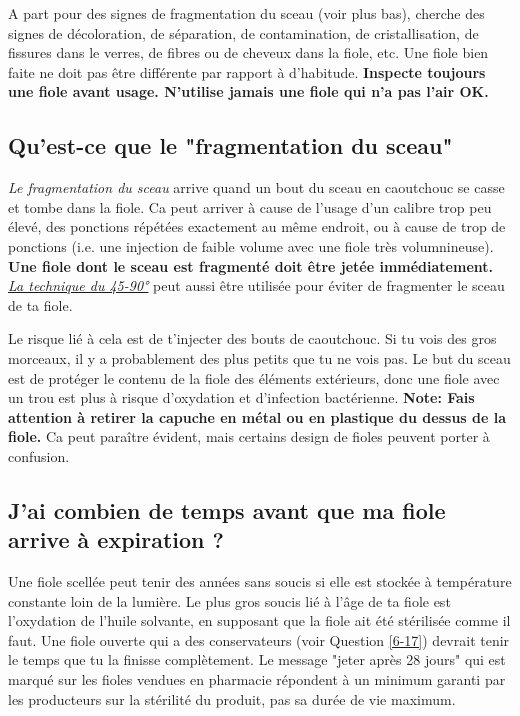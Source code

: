 \documentclass{article}
\begin{document}
A part pour des signes de fragmentation du sceau (voir plus bas), cherche des signes de décoloration, de séparation, de contamination, de cristallisation, de fissures dans le verres, de fibres ou de cheveux dans la fiole, etc. Une fiole bien faite ne doit pas être différente par rapport à d'habitude. \textbf{Inspecte toujours une fiole avant usage. N'utilise jamais une fiole qui n'a pas l'air OK.}

\subsection{Qu'est-ce que le "fragmentation du sceau"}\label{5-23}

\textit{Le fragmentation du sceau} arrive quand un bout du sceau en caoutchouc se casse et tombe dans la fiole. Ca peut arriver à cause de l'usage d'un calibre trop peu élevé, des ponctions répétées exactement au même endroit, ou à cause de trop de ponctions (i.e. une injection de faible volume avec une fiole très volumnineuse). \textbf{Une fiole dont le sceau est fragmenté doit être jetée immédiatement.} \href{https://www.youtube.com/watch?v=w5F0SLoMjC8}{\textit{La technique du 45-90°}} peut aussi être utilisée pour éviter de fragmenter le sceau de ta fiole.

Le risque lié à cela est de t'injecter des bouts de caoutchouc. Si tu vois des gros morceaux, il y a probablement des plus petits que tu ne vois pas. Le but du sceau est de protéger le contenu de la fiole des éléments extérieurs, donc une fiole avec un trou est plus à risque d'oxydation et d'infection bactérienne. \textbf{Note: Fais attention à retirer la capuche en métal ou en plastique du dessus de la fiole.} Ca peut paraître évident, mais certains design de fioles peuvent porter à confusion.

\subsection{J'ai combien de temps avant que ma fiole arrive à expiration ?}

Une fiole scellée peut tenir des années sans soucis si elle est stockée à température constante loin de la lumière. Le plus gros soucis lié à l'âge de ta fiole est l'oxydation de l'huile solvante, en supposant que la fiole ait été stérilisée comme il faut. Une fiole ouverte qui a des conservateurs (voir Question \ref{6-17}) devrait tenir le temps que tu la finisse complètement. Le message "jeter après 28 jours" qui est marqué sur les fioles vendues en pharmacie répondent à un minimum garanti par les producteurs sur la stérilité du produit, pas sa durée de vie maximum.
\end{document}
